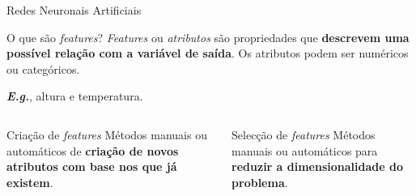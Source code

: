 \begin{frame}{Redes Neuronais Artificiais}

\begin{exampleblock}{O que são \textit{features}?}
    \textit{Features} ou \textit{atributos} são propriedades que \textbf{descrevem uma possível relação com a variável de saída}. Os atributos podem ser numéricos ou categóricos.
    
    \textbf{\textit{E.g.}}, altura e temperatura.
\end{exampleblock}

\pauseskip

\begin{columns}
    \begin{column}{0.45\textwidth}
        \begin{alertblock}{Criação de \textit{features}}
            Métodos manuais ou automáticos de \textbf{criação de novos atributos com base nos que já existem}.
        \end{alertblock}
    \end{column}
    \pause
    \begin{column}{0.45\textwidth}
        \begin{block}{Selecção de \textit{features}}
            Métodos manuais ou automáticos para \textbf{reduzir a dimensionalidade do problema}.
        \end{block}
    \end{column}
\end{columns}


\end{frame}

